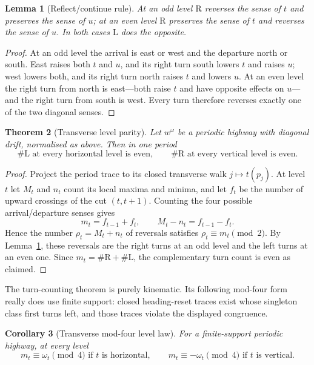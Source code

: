 \documentclass[11pt,letterpaper]{article}
\theoremstyle{plain}
\newtheorem{theorem}{Theorem}[section]
\newtheorem{lemma}[theorem]{Lemma}
\newtheorem{corollary}[theorem]{Corollary}
\theoremstyle{definition}
\newcommand{\turnR}{\mathrm{R}}
\newcommand{\turnL}{\mathrm{L}}
\begin{document}
\begin{NoHyper}
\begin{lemma}[Reflect/continue rule]\label{lem:reflect}
At an odd level $\turnR$ reverses the sense of $t$ and preserves the sense of $u$;
at an even level $\turnR$ preserves the sense of $t$ and reverses the sense of $u$.
In both cases $\turnL$ does the opposite.
\end{lemma}

\begin{proof}
At an odd level the arrival is east or west and the departure north or south. East
raises both $t$ and $u$, and its right turn south lowers $t$ and raises $u$; west
lowers both, and its right turn north raises $t$ and lowers $u$. At an even level
the right turn from north is east---both raise $t$ and have opposite effects on
$u$---and the right turn from south is west. Every turn therefore reverses exactly
one of the two diagonal senses.
\end{proof}

\begin{theorem}[Transverse level parity]\label{thm:levelparity}
Let $w^\omega$ be a periodic highway with diagonal drift, normalised as above.
Then in one period
\[
\#\turnL \text{ at every horizontal level is even},\qquad
\#\turnR \text{ at every vertical level is even}.
\]
\end{theorem}

\begin{proof}
Project the period trace to its closed transverse walk $j\mapsto t(p_j)$. At level
$t$ let $M_t$ and $n_t$ count its local maxima and minima, and let $f_t$ be the
number of upward crossings of the cut $(t,t+1)$. Counting the four possible
arrival/departure senses gives
\[
m_t=f_{t-1}+f_t,\qquad M_t-n_t=f_{t-1}-f_t .
\]
Hence the number $\rho_t=M_t+n_t$ of reversals satisfies
$\rho_t\equiv m_t\pmod2$. By Lemma~\ref{lem:reflect}, these reversals are the right
turns at an odd level and the left turns at an even one. Since
$m_t=\#\turnR+\#\turnL$, the complementary turn count is even as claimed.
\end{proof}

The turn-counting theorem is purely kinematic. Its following mod-four form really
does use finite support: closed heading-reset traces exist whose singleton class
first turns left, and those traces violate the displayed congruence.

\begin{corollary}[Transverse mod-four level law]\label{cor:mod4level}
For a finite-support periodic highway, at every level
\[
m_t\equiv\omega_t \pmod4 \text{ if $t$ is horizontal},\qquad
m_t\equiv-\omega_t \pmod4 \text{ if $t$ is vertical}.
\]
\end{corollary}


\end{NoHyper}
\end{document}
